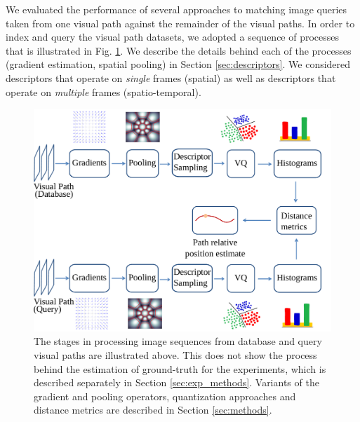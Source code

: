 We evaluated the performance of several approaches to matching image queries taken from one visual path against the remainder of the visual paths.  In order to index and query the visual path datasets, we adopted a sequence of processes that is illustrated in Fig. \ref{fig:FigPipeline}.  We describe the details behind each of the processes (\eg gradient estimation, spatial pooling) in Section \ref{sec:descriptors}.  We considered descriptors that operate on {\em single} frames (spatial) as well as descriptors that operate on {\em multiple} frames (spatio-temporal).

\begin{figure}
\begin{center}
\includegraphics[width=\textwidth]{./gfx/Chapter04/pipeline.pdf}
\caption{The stages in processing image sequences from database and query visual paths are illustrated above.  This does not show the process behind the estimation of ground-truth for the experiments, which is described separately in Section \ref{sec:exp_methods}.  Variants of the gradient and pooling operators, quantization approaches and distance metrics are described in Section \ref{sec:methods}.}
\label{fig:FigPipeline}
\end{center}
\end{figure}


